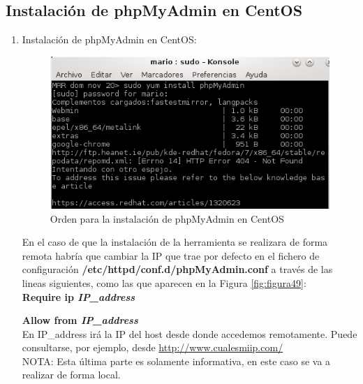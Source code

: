 \subsection{Instalación de phpMyAdmin en CentOS}
\cite{enlace23,enlace25}

\begin{enumerate}
	\item Instalación de phpMyAdmin en CentOS:
	
	\begin{figure}[H] %
		\centering
		\includegraphics[scale=0.7]{figuras/figura48.png} 
		\caption{Orden para la instalación de phpMyAdmin en CentOS} 
		\label{fig:figura48}
	\end{figure}
	
	En el caso de que la instalación de la herramienta se realizara de forma remota habría que cambiar la IP que trae por defecto en el fichero de configuración \textbf{/etc/httpd/conf.d/phpMyAdmin.conf} a través de las lineas siguientes, como las que aparecen en la Figura \ref{fig:figura49}:
	\\
	
	\textbf{Require ip \textit{ IP\_address }}
	
	\textbf{Allow from \textit{ IP\_address }}
	\\
	
	En IP\_address irá la IP del host desde donde accedemos remotamente.
	Puede consultarse, por ejemplo, desde  \url{http://www.cualesmiip.com/} 
	\\
	
	NOTA: Esta última parte es solamente informativa, en este caso se va a realizar de forma local.
	

\end{enumerate}
